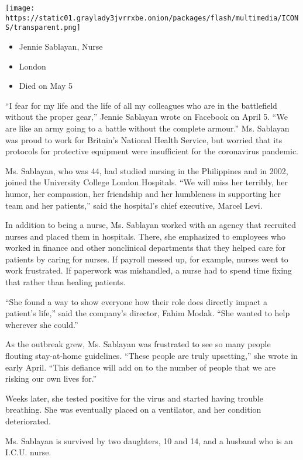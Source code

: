 \texttt{[image: https://static01.graylady3jvrrxbe.onion/packages/flash/multimedia/ICONS/transparent.png]}

\begin{itemize}
\tightlist
\item
  Jennie Sablayan, Nurse
\item
  London
\item
  Died on May 5
\end{itemize}

``I fear for my life and the life of all my colleagues who are in the
battlefield without the proper gear,'' Jennie Sablayan wrote on Facebook
on April 5. ``We are like an army going to a battle without the complete
armour.'' Ms. Sablayan was proud to work for Britain's National Health
Service, but worried that its protocols for protective equipment were
insufficient for the coronavirus pandemic.

Ms. Sablayan, who was 44, had studied nursing in the Philippines and in
2002, joined the University College London Hospitals. ``We will miss her
terribly, her humor, her compassion, her friendship and her humbleness
in supporting her team and her patients,'' said the hospital's chief
executive, Marcel Levi.

In addition to being a nurse, Ms. Sablayan worked with an agency that
recruited nurses and placed them in hospitals. There, she emphasized to
employees who worked in finance and other nonclinical departments that
they helped care for patients by caring for nurses. If payroll messed
up, for example, nurses went to work frustrated. If paperwork was
mishandled, a nurse had to spend time fixing that rather than healing
patients.

``She found a way to show everyone how their role does directly impact a
patient's life,'' said the company's director, Fahim Modak. ``She wanted
to help wherever she could.''

As the outbreak grew, Ms. Sablayan was frustrated to see so many people
flouting stay-at-home guidelines. ``These people are truly upsetting,''
she wrote in early April. ``This defiance will add on to the number of
people that we are risking our own lives for.''

Weeks later, she tested positive for the virus and started having
trouble breathing. She was eventually placed on a ventilator, and her
condition deteriorated.

Ms. Sablayan is survived by two daughters, 10 and 14, and a husband who
is an I.C.U. nurse.

